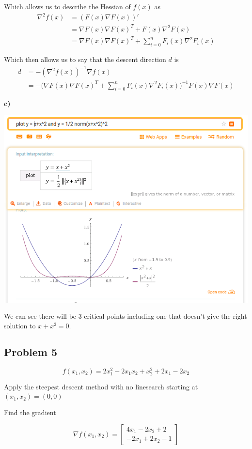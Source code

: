 Which allows us to describe the Hessian of $f(x)$  as
\begin{align*}
\nabla^2 f(x) &= (F(x) \nabla F(x))' \\
&= \nabla F(x) \nabla F(x)^T + F(x) \nabla^2 F(x) \\
&= \nabla F(x) \nabla F(x)^T + \sum_{i=0}^n F_i(x) \nabla^2F_i(x)
\end{align*}

Which then allows us to say that the descent direction $d$ is
\begin{align*}
	d &= - (\nabla^2 f(x))^{-1} \nabla f(x) \\
	  &= - \Bigg(\nabla F(x) \nabla F(x)^T + \sum_{i=0}^n F_i(x) \nabla^2F_i(x) \Bigg)^{-1} F(x) \nabla F(x)
\end{align*}


\textbf{c)}

\includegraphics[width=0.6\linewidth]{fig/unconstrained_exercices/pb4_c.png}

We can see there will be 3 critical points including one that doesn't give the right solution to $x+x^2 = 0$.

\subsection{Problem 5}

\[
f(x_1, x_2) = 2x_1^2 -2x_1x_2 + x_2^2 + 2x_1 -2x_2
\]

Apply the steepest descent method with no linesearch starting at $(x_1, x_2) = (0,0)$

\answer

Find the gradient

\[
	\nabla f(x_1, x_2) = 
	\begin{bmatrix}
		4x_1 - 2x_2 + 2 \\
		-2x_1 + 2x_2 - 1	
	\end{bmatrix}
\]


